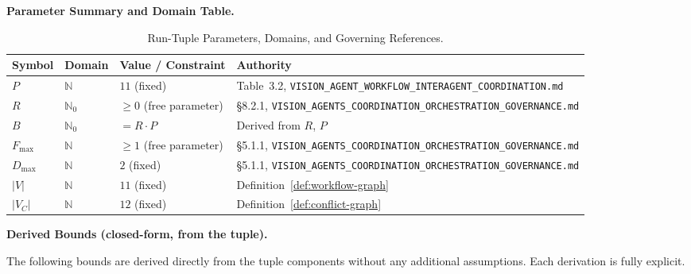 \documentclass[12pt]{article}
\theoremstyle{definition}
\newcommand{\code}[1]{\texttt{#1}}
\newcommand{\VisionGov}{\code{VISION\_AGENTS\_\allowbreak COORDINATION\_\allowbreak ORCHESTRATION\_\allowbreak GOVERNANCE.md}}
\newcommand{\VisionFlow}{\code{VISION\_AGENT\_\allowbreak WORKFLOW\_\allowbreak INTERAGENT\_\allowbreak COORDINATION.md}}
\begin{document}
\medskip
\noindent\textbf{Parameter Summary and Domain Table.}

\begin{table}[H]
\centering
\caption{Run-Tuple Parameters, Domains, and Governing References.}
\label{tab:params}
\begin{tabular}{@{}l l l p{4.0cm}@{}}
\toprule
\textbf{Symbol} & \textbf{Domain} & \textbf{Value / Constraint}
  & \textbf{Authority} \\
\midrule
$P$
  & $\mathbb{N}$
  & $11$ (fixed)
  & Table~3.2, \VisionFlow{} \\
$R$
  & $\mathbb{N}_0$
  & $\geq 0$ (free parameter)
  & \S8.2.1, \VisionGov{} \\
$B$
  & $\mathbb{N}_0$
  & $= R \cdot P$
  & Derived from $R$, $P$ \\
$F_{\max}$
  & $\mathbb{N}$
  & $\geq 1$ (free parameter)
  & \S5.1.1, \VisionGov{} \\
$D_{\max}$
  & $\mathbb{N}$
  & $2$ (fixed)
  & \S5.1.1, \VisionGov{} \\
$|V|$
  & $\mathbb{N}$
  & $11$ (fixed)
  & Definition~\ref{def:workflow-graph} \\
$|V_C|$
  & $\mathbb{N}$
  & $12$ (fixed)
  & Definition~\ref{def:conflict-graph} \\
\bottomrule
\end{tabular}
\end{table}

\medskip
\noindent\textbf{Derived Bounds (closed-form, from the tuple).}

The following bounds are derived directly from the tuple components
without any additional assumptions.  Each derivation is fully
explicit.
\end{document}
